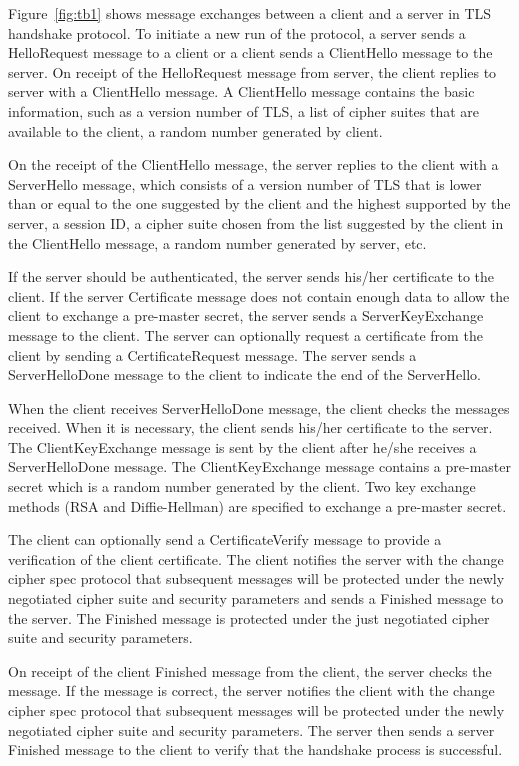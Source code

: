\documentclass[a4paper,fleqn]{cas-dc}
\begin{document}
Figure~\ref{fig:tb1} shows message exchanges between a client and a server in TLS handshake protocol. To initiate a new run of the protocol, a server sends a HelloRequest message to a client or a client sends a ClientHello message to the server. On receipt of the HelloRequest message from server, the client replies to server with a ClientHello message. A ClientHello message contains the basic information, such as a version number of TLS, a list of cipher suites that are available to the client, a random number generated by client.

On the receipt of the ClientHello message, the server replies to the client with a ServerHello message, which consists of a version number of TLS that is lower than or equal to the one suggested by the client and the highest supported by the server, a session ID, a cipher suite chosen from the list suggested by the client in the ClientHello message, a random number generated by server, etc. 

If the server should be authenticated, the server sends  his/her certificate to the client. If the server Certificate message does not contain enough data to allow the client to exchange a pre-master secret, the server sends a ServerKeyExchange message to the client. The server can optionally request a certificate from the client by sending a CertificateRequest message. The server sends a ServerHelloDone message to the client to indicate the end of the ServerHello.

When the client receives ServerHelloDone message, the client checks the messages received. When it is necessary, the client sends his/her certificate to the server. The ClientKeyExchange message is sent by the client after he/she receives a ServerHelloDone message. The ClientKeyExchange message contains a pre-master secret which is a random number generated by the client. Two key exchange methods (RSA and Diffie-Hellman) are specified to exchange a pre-master secret. 

The client can optionally send a CertificateVerify message to provide a verification of the client certificate.
The client notifies the server with the change cipher spec protocol that subsequent messages will be protected under the newly negotiated cipher suite and security parameters and sends a Finished message to the server. The Finished message is protected under the just negotiated cipher suite and security parameters.

On receipt of the client Finished message from the client, the server
checks the message. If the message is correct, the server notifies the client with the change cipher spec protocol that subsequent messages will be protected under the newly negotiated cipher suite and security parameters. The server then sends a server Finished message to the client to verify that the handshake process is successful.
\end{document}
